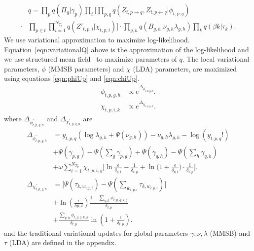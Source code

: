 \documentclass{sig-alternate}
\begin{document}
\vspace*{-1\baselineskip}
\small
\begin{align}
	&q = \prod_{p}q(\Pi_{q} | \gamma_{p}) \prod_{t} \bigg[ \prod_{p, q} \! 
q(Z_{t, p \rightarrow q}, Z_{t, p \leftarrow q} | \phi_{t,p,q})  \nonumber\\ 
\cdot &\prod_{p \in t} \prod_{i=1}^{N_{T_{p}}} q(Z'_{t,p,i} | \chi_{t,p,i})
\bigg] %
\cdot \prod_{g,h} q(B_{g,h} | \nu_{g,h} \lambda_{g,h}) \prod_{k} q(\beta{k} |
\tau_{k}).
\label{eqn:variationalQ}
\end{align}
\normalsize
We use variational approximation to maximize log-likelihood.
Equation~\ref{eqn:variationalQ} above is the approximation of the log-likelihood and we
use structured mean field~\cite{Xing_et_al:2003} to maximize parameters of $q$.
The local variational parameters, $\phi$ (MMSB parameters) and $\chi$ (LDA)
parameters, are maximized using equations \ref{eqn:phiUp} and \ref{eqn:chiUp}.
\small
\begin{align}
	\phi_{t,p,g,h} &\propto e^{\Delta_{\phi^{'}_{t,p,g,h}}}.
\label{eqn:phiUp}                                 \\
\chi_{t,p,i,k} &\propto e^{\Delta_{\chi^{'}_{t,p,g,h}}}.
\label{eqn:chiUp}
\end{align}
where $\Delta_{\phi^{'}_{t,p,g,h}}$ and $\Delta_{\chi^{'}_{t,p,g,h}}$ are
\begin{align}
\Delta_{\phi^{'}_{t,p,g,h}} &= y_{t,p,q}( \log \! \lambda_{g,h} + 
\Psi(\nu_{g,h})) - \nu_{g,h} \lambda_{g,h} - \log \! (y_{t,p,q}!)
\nonumber \\ & + \Psi(\gamma_{p,g}) - \Psi(\sum_{g} \gamma_{p,g})
+ \Psi(\gamma_{q,h}) - \Psi(\sum_{h} \gamma_{q,h})
\nonumber \\  & + \omega\sum_{i=1}^{N_{T_{P}}} \! \chi_{t,p,i,g} 
\bigg[ \ln \! \frac{\epsilon}{\delta_{p,t}} - \frac{1}{\delta_{t,p}} 
+ \ln \bigg( 1 + \frac{\epsilon}{\delta_{p,t}} \bigg) 
\cdot \frac{1}{\delta_{t,p}} \bigg].
\label{eqn:phiDelta}
  \\
\Delta_{\chi^{'}_{t,p,g,h}} &= \bigg[ \Psi(\tau_{k,w_{t,p,i}}) - 
\Psi(\sum_{w_{t,p,i}} \! \tau_{k, w_{t,p,i}}) \bigg]
\nonumber \\  & + \ln \! (\frac{\epsilon}{\delta{p,t}}) \frac{1 - 
\sum_{q,h} \! \phi_{t,p,q,k,j}}{\delta_{t,p}} 
\nonumber\\  & + \frac{\sum_{q,h} \phi_{t,p,q,k,h}}{\delta_{t,p}} 
\ln \! (1 + \frac{\epsilon}{\delta_{t,p}}).
\label{eqn:chiDelta}
\end{align}
\normalsize
and the traditional variational updates for global parameters $\gamma, \nu, \lambda$
(MMSB) and $\tau$ (LDA) are defined in the appendix.
\vspace*{-0.5\baselineskip}
\end{document}
